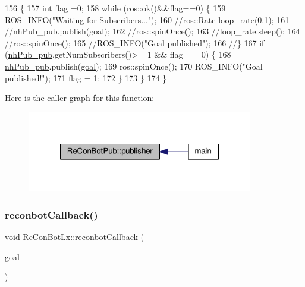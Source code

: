 \begin{DoxyCode}
156                                                                      \{
157   \textcolor{keywordtype}{int} flag =0;
158   \textcolor{keywordflow}{while} (ros::ok()&&flag==0) \{
159     ROS\_INFO(\textcolor{stringliteral}{"Waiting for Subscribers..."});
160   \textcolor{comment}{//ros::Rate loop\_rate(0.1);}
161   \textcolor{comment}{//nhPub\_pub.publish(goal);}
162   \textcolor{comment}{//ros::spinOnce();}
163   \textcolor{comment}{//loop\_rate.sleep();}
164   \textcolor{comment}{//ros::spinOnce();}
165   \textcolor{comment}{//ROS\_INFO("Goal published");}
166 \textcolor{comment}{//\}}
167     \textcolor{keywordflow}{if} (\hyperlink{class_re_con_bot_a549b7542d286b690f38b7ece8b83850b}{nhPub\_pub}.getNumSubscribers()>= 1 && flag == 0) \{
168       \hyperlink{class_re_con_bot_a549b7542d286b690f38b7ece8b83850b}{nhPub\_pub}.publish(\hyperlink{class_re_con_bot_a9bd1c7ddf2376e2e68ea5d8bd8c3f505}{goal});
169       ros::spinOnce();
170       ROS\_INFO(\textcolor{stringliteral}{"Goal published!"});
171       flag = 1;
172     \}
173   \}
174 \}
\end{DoxyCode}
Here is the caller graph for this function\+:\nopagebreak
\begin{figure}[H]
\begin{center}
\leavevmode
\includegraphics[width=280pt]{d6/d1b/class_re_con_bot_pub_ac763949cb5256de695e02c5f81084ead_icgraph}
\end{center}
\end{figure}
\mbox{\label{class_re_con_bot_lx_a5d60b16962e5ce8e452f7c53543c54ce}} 
\subsubsection{\texorpdfstring{reconbot\+Callback()}{reconbotCallback()}}
{\footnotesize\ttfamily void Re\+Con\+Bot\+Lx\+::reconbot\+Callback (\begin{DoxyParamCaption}\item[{const control\+\_\+msgs\+::\+Follow\+Joint\+Trajectory\+Goal}]{goal }\end{DoxyParamCaption})\hspace{0.3cm}{\ttfamily [inherited]}}



